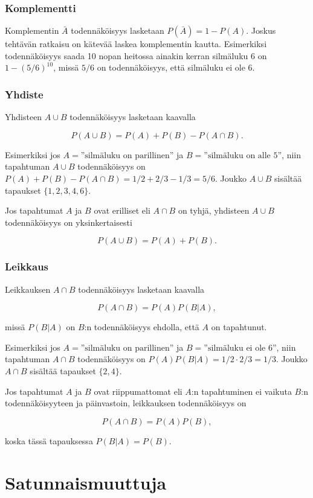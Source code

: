 \subsubsection*{Komplementti}

Komplementin $\bar A$
todennäköisyys lasketaan $P(\bar A)=1-P(A)$.
Joskus tehtävän ratkaisu on kätevää
laskea komplementin kautta.
Esimerkiksi todennäköisyys saada
10 nopan heitossa ainakin
kerran silmäluku 6 on $1-(5/6)^{10}$,
missä $5/6$ on todennäköisyys, että silmäluku ei ole 6.

\subsubsection*{Yhdiste}

Yhdisteen $A \cup B$ todennäköisyys lasketaan kaavalla 

\[P(A \cup B)=P(A)+P(B)-P(A \cap B).\]

Esimerkiksi jos $A=\textrm{''silmäluku on parillinen''}$
ja $B=\textrm{''silmäluku on alle 5''}$,
niin tapahtuman $A \cup B$ todennäköisyys
on $P(A)+P(B)-P(A \cap B)=1/2+2/3-1/3=5/6$.
Joukko $A \cup B$ sisältää tapaukset $\{1,2,3,4,6\}$.

Jos tapahtumat $A$ ja $B$ ovat erilliset eli $A \cap B$ on tyhjä,
yhdisteen $A \cup B$ todennäköisyys on yksinkertaisesti

\[P(A \cup B)=P(A)+P(B).\]

\subsubsection*{Leikkaus}

Leikkauksen $A \cap B$ todennäköisyys lasketaan kaavalla

\[P(A \cap B)=P(A)P(B|A),\]

missä $P(B|A)$ on $B$:n todennäköisyys
ehdolla, että $A$ on tapahtunut.

Esimerkiksi jos $A=\textrm{''silmäluku on parillinen''}$
ja $B=\textrm{''silmäluku ei ole 6''}$,
niin tapahtuman $A \cap B$ todennäköisyys
on $P(A)P(B|A)=1/2 \cdot 2/3 = 1/3$.
Joukko $A \cap B$ sisältää tapaukset $\{2,4\}$.


Jos tapahtumat $A$ ja $B$ ovat riippumattomat
eli $A$:n tapahtuminen ei vaikuta $B$:n todennäköisyyteen
ja päinvastoin, leikkauksen todennäköisyys on

\[P(A \cap B)=P(A)P(B),\]

koska tässä tapauksessa $P(B|A)=P(B)$.

\section{Satunnaismuuttuja}


